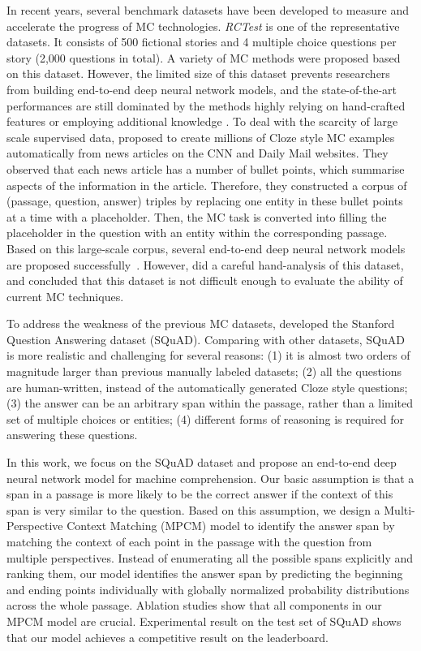 \documentclass[11pt,letterpaper]{article}
\begin{document}
In recent years, several benchmark datasets have been developed to measure and accelerate the progress of MC technologies. \emph{RCTest} \cite{richardson2013mctest} is one of the representative datasets. It consists of 500 fictional stories and 4 multiple choice questions per story (2,000 questions in total). A variety of MC methods were proposed based on this dataset. However, the limited size of this dataset prevents researchers from building end-to-end deep neural network models, and the state-of-the-art performances are still dominated by the methods highly relying on hand-crafted features \cite{sachan2015learning,wang2015machine} or employing additional knowledge \cite{wang2016employing}. To deal with the scarcity of large scale supervised data,  proposed to create millions of Cloze style MC examples automatically from news articles on the CNN and Daily Mail websites. They observed that each news article has a number of bullet points, which summarise aspects of the information in the article. Therefore, they constructed a corpus of (passage, question, answer) triples by replacing one entity in these bullet points at a time with a placeholder. Then, the MC task is converted into filling the placeholder in the question with an entity within the corresponding passage. Based on this large-scale corpus, several end-to-end deep neural network models are proposed successfully~\cite{hermann2015teaching,kadlec2016text,shen2016reasonet}. However,  did a careful hand-analysis of this dataset, and concluded that this dataset is not difficult enough to evaluate the ability of current MC techniques. 

To address the weakness of the previous MC datasets,  developed the Stanford Question Answering dataset (SQuAD). Comparing with other datasets, SQuAD is more realistic and challenging for several reasons: (1) it is almost two orders of magnitude larger than previous manually labeled datasets; (2) all the questions are human-written, instead of the automatically generated Cloze style questions; (3) the answer can be an arbitrary span within the passage, rather than a limited set of multiple choices or entities; (4) different forms of reasoning is required for answering these questions.

In this work, we focus on the SQuAD dataset and propose an end-to-end deep neural network model for machine comprehension. 
Our basic assumption is that a span in a passage is more likely to be the correct answer 
if the context of this span is very similar to the question.
Based on this assumption, we design a Multi-Perspective Context Matching (MPCM) model to identify the answer span 
by matching the context of each point in the passage with the question from multiple perspectives. 
Instead of enumerating all the possible spans explicitly and ranking them, 
our model identifies the answer span by predicting the beginning and ending points individually with globally normalized probability distributions across the whole passage. 
Ablation studies show that all components in our MPCM model are crucial. 
Experimental result on the test set of SQuAD shows that our model achieves a competitive result on the leaderboard. 
\end{document}
